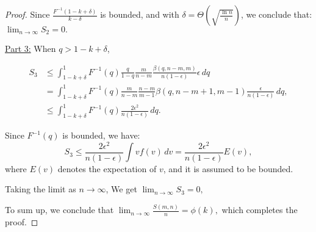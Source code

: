 \begin{proof}
Since \( \frac{F^{-1}(1-k+\delta)}{k-\delta} \) is bounded, and with \( \delta = \Theta\left(\sqrt{\frac{\ln n}{n}}\right) \), we conclude that: \(\lim_{n \to \infty} S_2 = 0.\)
    

    \underline{Part 3:} When $q>1-k+\delta$,

\[
\begin{aligned}
    S_3 & \leq \int_{1-k+\delta}^1 F^{-1}(q) \frac{q}{1-q} \frac{m}{n-m} \frac{\beta(q, n-m, m)}{n(1-\epsilon)} \epsilon \, dq 
\\ & = \int_{1-k+\delta}^1 F^{-1}(q) \frac{m}{n-m} \frac{n-m}{m-1} \beta(q, n-m+1, m-1) \frac{\epsilon}{n(1-\epsilon)} \, dq,
\\ & \leq\int_{1-k+\delta}^1 F^{-1}(q) \frac{2\epsilon^2}{n(1-\epsilon)} \, dq.
\end{aligned}
\]

Since \( F^{-1}(q) \) is bounded, we have:
\[
S_3 \leq \frac{2\epsilon^2}{n(1-\epsilon)} \int v f(v) \, dv = \frac{2\epsilon^2}{n(1-\epsilon)} E(v),
\]where \( E(v) \) denotes the expectation of \( v \), and it is assumed to be bounded. 

Taking the limit as \( n \to \infty \), We get
\(\lim_{n \to \infty} S_3 = 0,
\)

    

    To sum up, we conclude that \(
\lim_{n \to \infty} \frac{S(m,n)}{n} = \phi(k),
\) which completes the proof.
\end{proof}


